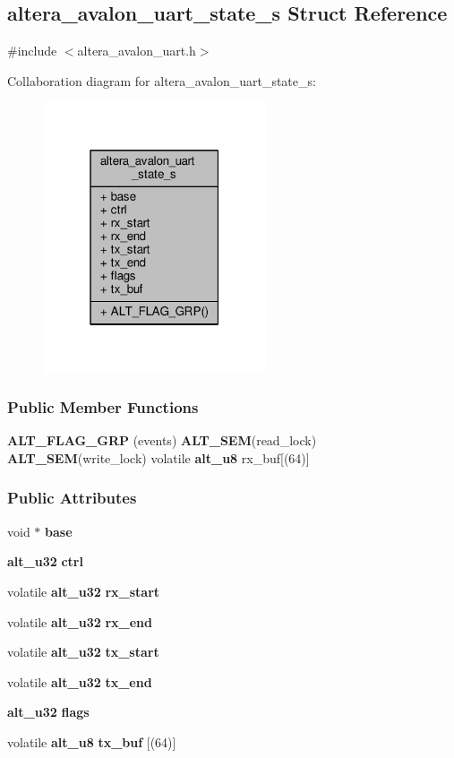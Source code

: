 \subsection{altera\+\_\+avalon\+\_\+uart\+\_\+state\+\_\+s Struct Reference}
\label{structaltera__avalon__uart__state__s}


{\ttfamily \#include $<$altera\+\_\+avalon\+\_\+uart.\+h$>$}



Collaboration diagram for altera\+\_\+avalon\+\_\+uart\+\_\+state\+\_\+s\+:
\nopagebreak
\begin{figure}[H]
\begin{center}
\leavevmode
\includegraphics[width=187pt]{d4/d19/structaltera__avalon__uart__state__s__coll__graph}
\end{center}
\end{figure}
\subsubsection*{Public Member Functions}
\begin{DoxyCompactItemize}
\item 
{\bf A\+L\+T\+\_\+\+F\+L\+A\+G\+\_\+\+G\+RP} (events) {\bf A\+L\+T\+\_\+\+S\+EM}(read\+\_\+lock) {\bf A\+L\+T\+\_\+\+S\+EM}(write\+\_\+lock) volatile {\bf alt\+\_\+u8} rx\+\_\+buf[(64)]
\end{DoxyCompactItemize}
\subsubsection*{Public Attributes}
\begin{DoxyCompactItemize}
\item 
void $\ast$ {\bf base}
\item 
{\bf alt\+\_\+u32} {\bf ctrl}
\item 
volatile {\bf alt\+\_\+u32} {\bf rx\+\_\+start}
\item 
volatile {\bf alt\+\_\+u32} {\bf rx\+\_\+end}
\item 
volatile {\bf alt\+\_\+u32} {\bf tx\+\_\+start}
\item 
volatile {\bf alt\+\_\+u32} {\bf tx\+\_\+end}
\item 
{\bf alt\+\_\+u32} {\bf flags}
\item 
volatile {\bf alt\+\_\+u8} {\bf tx\+\_\+buf} [(64)]
\end{DoxyCompactItemize}


